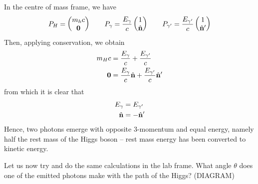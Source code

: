 \documentclass{../../template/note}
\begin{document}
    In the centre of mass frame, we have
    \begin{align*}
        P_H = \begin{pmatrix}
            m_hc \\
            \V 0 \\
        \end{pmatrix} \qquad P_\gamma = \frac{E_\gamma}{c} \begin{pmatrix}
            1 \\
            \hvec n \\
        \end{pmatrix} \qquad P_{\gamma'} = \frac{E_{\gamma'}}{c} \begin{pmatrix}
            1 \\
            \hvec n' \\
        \end{pmatrix}
    \end{align*}
    Then, applying conservation, we obtain
    \begin{align*}
        m_H c &= \frac{E_\gamma}{c} + \frac{E_{\gamma'}}{c}\\ 
        \V 0 &= \frac{E_{\gamma}}{c} \hvec n + \frac{E_{\gamma'}}{c} \hvec n'
    \end{align*}
    from which it is clear that
    \begin{align*}
        E_\gamma &= E_{\gamma'} \\
        \hvec n &= -\hvec n'
    \end{align*}
    Hence, two photons emerge with opposite 3-momentum and equal energy, namely half the rest mass of the Higgs boson -- rest mass energy has been converted to kinetic energy.

    Let us now try and do the same calculations in the lab frame. What angle \(\theta\) does one of the emitted photons make with the path of the Higgs? (DIAGRAM)
\end{document}
